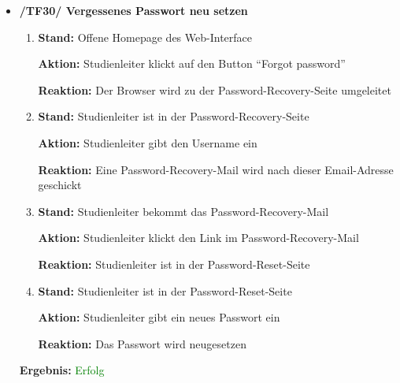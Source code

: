 \documentclass[a4paper]{scrreprt}
\begin{document}
\begin{itemize}
						\item \textbf{/TF30/ Vergessenes Passwort neu setzen}
                                \begin{enumerate}
                                    \item \par \textbf{Stand: }Offene Homepage des Web-Interface
                                       \par \textbf{Aktion: }Studienleiter klickt auf den Button ``Forgot password''
                                         \par \textbf{Reaktion: }Der Browser wird zu der Password-Recovery-Seite umgeleitet
                                     \item \par \textbf{Stand: }Studienleiter ist in der Password-Recovery-Seite
                                         \par \textbf{Aktion: }Studienleiter gibt den Username ein
                                         \par \textbf{Reaktion: }Eine Password-Recovery-Mail wird nach dieser Email-Adresse geschickt
                                     \item \par \textbf{Stand: }Studienleiter bekommt das Password-Recovery-Mail
                                         \par \textbf{Aktion: }Studienleiter klickt den Link im Password-Recovery-Mail
                                         \par \textbf{Reaktion: }Studienleiter ist in der Password-Reset-Seite
                                     \item \par \textbf{Stand: }Studienleiter ist in der Password-Reset-Seite
                                         \par \textbf{Aktion: }Studienleiter gibt ein neues Passwort ein
                                         \par \textbf{Reaktion: }Das Passwort wird neugesetzen
                                 \end{enumerate}
                                 \vspace*{0.3cm}
                                 \par \textbf{Ergebnis: }\textcolor{green}{Erfolg}
                                 \vspace*{0.6cm}
		      		

\end{itemize}
\end{document}
